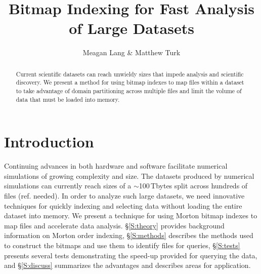 \documentclass[apjl]{emulateapj}
\newcommand{\todo}[1]{{\color{red}{#1}}}
\newcommand{\addref}{{\color{red}(ref. needed)}}
\newcommand{\TB}{\,Tbytes}
\begin{document}

\title{Bitmap Indexing for Fast Analysis of Large Datasets}

\author{Meagan Lang \& Matthew Turk}




\begin{abstract}
Current scientific datasets can reach unwieldy sizes that impede analysis and scientific discovery. We present a method for using bitmap indexes to map files within a dataset to take advantage of domain partitioning across multiple files and limit the volume of data that must be loaded into memory. 
\todo{more...}
\end{abstract}


\section{Introduction}\label{S:intro}
Continuing advances in both hardware and software facilitate numerical simulations of growing complexity and size. The datasets produced by numerical simulations can currently reach sizes of a $\sim$100\TB{ }split across hundreds of files \citep[e.g.][]{Croft2015}\addref. In order to analyze such large datasets, we need innovative techniques for quickly indexing and selecting data without loading the entire dataset into memory. We present a technique for using Morton bitmap indexes to map files and accelerate data analysis. \S\ref{S:theory} provides background information on Morton order indexing, \S\ref{S:methods} describes the methods used to construct the bitmaps and use them to identify files for queries, \S\ref{S:tests} presents several tests demonstrating the speed-up provided for querying the data, and \S\ref{S:discuss} summarizes the advantages and describes areas for application.
\end{document}
